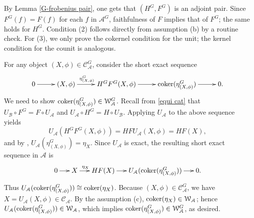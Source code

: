 \documentclass[12pt,twoside]{amsart}
\theoremstyle{bfupright head,slanted body}
\theoremstyle{bfupright head,upright body}
\theoremstyle{fixed bf head,slanted body}
\theoremstyle{fixed bf head,upright body}
\theoremstyle{numbered paragraph}
\newenvironment{prf*}[1][Proof]{%
  \begin{proof}[\bf #1]
    \setcounter{equation}{0}
    \renewcommand{\theequation}{\arabic{equation}}}
  {\end{proof}
}
\newcommand{\lemcite}[2][?]{\cite[Lemma~#1]{#2}}
\numberwithin{equation}{res}
\newcommand{\calC}{\mathcal{C}}
\newcommand{\calW}{\mathcal{W}}
\newcommand{\calA}{\mathcal{A}}
\newcommand{\calB}{\mathcal{B}}
\newcommand{\cok}{\mbox{\rm coker}}
\begin{document}
\begin{prf*}
By Lemma \ref{G-frobenius pair}, one gets that $(H^G, F^G)$ is an adjoint pair.
Since $F^G(f)=F(f)$ for each $f$ in $\calA^G$, faithfulness of $F$ implies that of $F^G$; the same holds for $H^G$.
Condition (2) follows directly from assumption (b) by a routine check.
For (3), we only prove the cokernel condition for the unit; the kernel condition for the counit is analogous.

For any object $(X,\phi)\in\calC_\calA^G$, consider the short exact sequence
\[
\xymatrix@C=0.9cm{
0 \ar[r] & (X,\phi) \ar[r]^{\eta^G_{(X,\phi)} \quad \,\,} & H^G F^G(X,\phi) \ar[r] & \cok(\eta^G_{(X,\phi)}) \ar[r] & 0.
}
\]
We need to show $\cok(\eta^G_{(X,\phi)})\in\calW_\calA^G$.
Recall from \ref{equi cat} that $U_\calB \circ F^G = F \circ U_\calA$ and $U_\calA \circ H^G = H \circ U_\calB$.
Applying $U_\calA$ to the above sequence yields
\[
U_\calA(H^G F^G(X,\phi)) = H F U_\calA(X,\phi) = H F(X),
\]
and by \lemcite[2.9]{2019Sun}, $U_\calA(\eta^G_{(X,\phi)}) = \eta_X$.
Since $U_\calA$ is exact, the resulting short exact sequence in $\calA$ is
\[
\xymatrix@C=0.5cm{
0 \ar[r] & X \ar[r]^{\eta_X \quad} & H F(X) \ar[r] & U_\calA(\cok(\eta^G_{(X,\phi)})) \ar[r] & 0.
}
\]
Thus $U_\calA(\cok(\eta^G_{(X,\phi)})) \cong \cok(\eta_X)$.
Because $(X,\phi)\in\calC_\calA^G$, we have $X = U_\calA(X,\phi)\in\calC_\calA$.
By the assumption (c), $\cok(\eta_X)\in\calW_\calA$; hence $U_\calA(\cok(\eta^G_{(X,\phi)}))\in\calW_\calA$, which implies $\cok(\eta^G_{(X,\phi)})\in\calW_\calA^G$, as desired.
\end{prf*}
\end{document}
